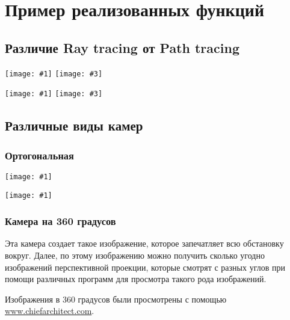 \section{Пример реализованных функций}

\newcommand{\img}[2]{
\begin{center}
\texttt{[image: \#1]}	
\end{center}
}

\newcommand{\imgtwo}[4]{
\noindent\begin{center}
\texttt{[image: \#1]}
\texttt{[image: \#3]}
\end{center}
}

\subsection{Различие Ray tracing от Path tracing}

\imgtwo{img/standard_scene_ray_perspective.png}{0.49}{img/standard_scene_path_perspective.png}{0.49}

\imgtwo{img/standard_scene_2_ray_perspective.png}{0.49}{img/standard_scene_2_path_perspective.png}{0.49}

\subsection{Различные виды камер}

\subsubsection{Ортогональная}

\img{img/standard_scene_ray_orthogonal.png}{0.7}

\img{img/standard_scene_2_ray_orthogonal.png}{0.7}

\subsubsection{Камера на 360 градусов}

Эта камера создает такое изображение, которое запечатляет всю обстановку вокруг. Далее, по этому изображению можно получить сколько угодно изображений перспективной проекции, которые смотрят с разных углов при помощи различных программ для просмотра такого рода изображений.

Изображения в 360 градусов были просмотрены с помощью \href{https://www.chiefarchitect.com/products/360-panorama-viewer/}{www.chiefarchitect.com}.

